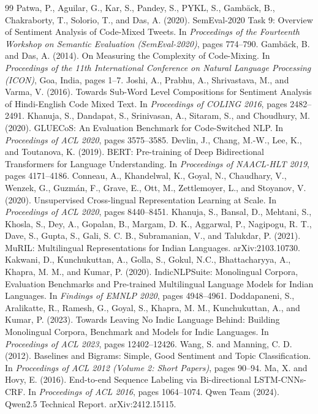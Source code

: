 \begin{thebibliography}{99}
 Patwa, P., Aguilar, G., Kar, S., Pandey, S., PYKL, S., Gamb\"ack, B., Chakraborty, T., Solorio, T.,
and Das, A. (2020). SemEval-2020 Task 9: Overview of Sentiment Analysis of Code-Mixed Tweets. In \emph{Proceedings of
the Fourteenth Workshop on Semantic Evaluation (SemEval-2020)}, pages 774--790.
 Gamb\"ack, B. and Das, A. (2014). On Measuring the Complexity of Code-Mixing. In
\emph{Proceedings of the 11th International Conference on Natural Language Processing (ICON)}, Goa, India, pages 1--7.
 Joshi, A., Prabhu, A., Shrivastava, M., and Varma, V. (2016). Towards Sub-Word Level Compositions for
Sentiment Analysis of Hindi-English Code Mixed Text. In \emph{Proceedings of COLING 2016}, pages 2482--2491.
 Khanuja, S., Dandapat, S., Srinivasan, A., Sitaram, S., and Choudhury, M. (2020). GLUECoS: An
Evaluation Benchmark for Code-Switched NLP. In \emph{Proceedings of ACL 2020}, pages 3575--3585.
 Devlin, J., Chang, M.-W., Lee, K., and Toutanova, K. (2019). BERT: Pre-training of Deep Bidirectional
Transformers for Language Understanding. In \emph{Proceedings of NAACL-HLT 2019}, pages 4171--4186.
 Conneau, A., Khandelwal, K., Goyal, N., Chaudhary, V., Wenzek, G., Guzm\'an, F., Grave, E., Ott, M.,
Zettlemoyer, L., and Stoyanov, V. (2020). Unsupervised Cross-lingual Representation Learning at Scale. In
\emph{Proceedings of ACL 2020}, pages 8440--8451.
 Khanuja, S., Bansal, D., Mehtani, S., Khosla, S., Dey, A., Gopalan, B., Margam, D. K., Aggarwal, P.,
Nagipogu, R. T., Dave, S., Gupta, S., Gali, S. C. B., Subramanian, V., and Talukdar, P. (2021). MuRIL: Multilingual
Representations for Indian Languages. arXiv:2103.10730.
 Kakwani, D., Kunchukuttan, A., Golla, S., Gokul, N.C., Bhattacharyya, A., Khapra, M. M., and
Kumar, P. (2020). IndicNLPSuite: Monolingual Corpora, Evaluation Benchmarks and Pre-trained Multilingual Language Models
for Indian Languages. In \emph{Findings of EMNLP 2020}, pages 4948--4961.
 Doddapaneni, S., Aralikatte, R., Ramesh, G., Goyal, S., Khapra, M. M., Kunchukuttan, A., and
Kumar, P. (2023). Towards Leaving No Indic Language Behind: Building Monolingual Corpora, Benchmark and Models for Indic
Languages. In \emph{Proceedings of ACL 2023}, pages 12402--12426.
 Wang, S. and Manning, C. D. (2012). Baselines and Bigrams: Simple, Good Sentiment and Topic
Classification. In \emph{Proceedings of ACL 2012 (Volume 2: Short Papers)}, pages 90--94.
 Ma, X. and Hovy, E. (2016). End-to-end Sequence Labeling via Bi-directional LSTM-CNNs-CRF. In
\emph{Proceedings of ACL 2016}, pages 1064--1074.
 Qwen Team (2024). Qwen2.5 Technical Report. arXiv:2412.15115.
\end{thebibliography}
